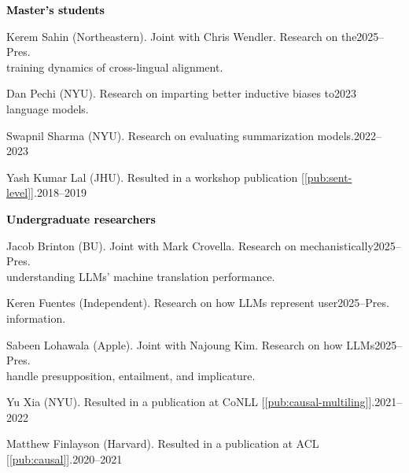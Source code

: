 \documentclass[10pt]{article}
\renewcommand{\subsection}[1]{\textcolor{black}{#1}}
\newcommand{\halfblankline}{\quad\vspace{-0.5\baselineskip}\pagebreak[3]}
\begin{document}
	\halfblankline\vspace{-0.5pt}

	\subsection{\textbf{Master's students}}
	\begin{innerlist}
	\item Kerem Sahin (Northeastern). Joint with Chris Wendler. Research on the\hfill 2025--Pres.\\
	      training dynamics of cross-lingual alignment.
	\item Dan Pechi (NYU). Research on imparting better inductive biases to\hfill2023\\language models.
	\item Swapnil Sharma (NYU). Research on evaluating summarization models.\hfill 2022--2023
	\item Yash Kumar Lal (JHU). Resulted in a workshop publication [\ref{pub:sent-level}].\hfill 2018--2019
	\end{innerlist}

	\halfblankline\vspace{-0.5pt}

	\subsection{\textbf{Undergraduate researchers}}
	\begin{innerlist}
	\item Jacob Brinton (BU). Joint with Mark Crovella. Research on mechanistically\hfill 2025--Pres.\\understanding
	      LLMs' machine translation performance.
	\item Keren Fuentes (Independent). Research on how LLMs represent user\hfill 2025--Pres.\\information.
	\item Sabeen Lohawala (Apple). Joint with Najoung Kim. Research on how LLMs\hfill 2025--Pres.\\
		  handle presupposition, entailment, and implicature.
	\item Yu Xia (NYU). Resulted in a publication at CoNLL [\ref{pub:causal-multiling}].\hfill 2021--2022
	\item Matthew Finlayson (Harvard). Resulted in a publication at ACL [\ref{pub:causal}].\hfill 2020--2021
	\end{innerlist}

	\halfblankline\vspace{-0.5pt}
\end{document}
